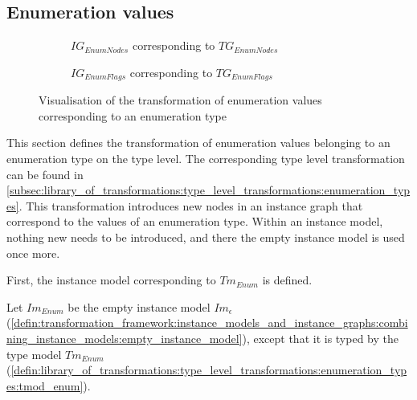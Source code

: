\subsection{Enumeration values}
\label{subsec:library_of_transformations:instance_level_transformations:enumeration_values}

\begin{figure}
    \centering
    \begin{subfigure}{0.45\textwidth}
        \centering
        
        \caption{$IG_{EnumNodes}$ corresponding to $TG_{EnumNodes}$}
        \label{fig:library_of_transformations:instance_level_transformations:enumeration_values:visualisation:groove_nodes}
    \end{subfigure}
    \begin{subfigure}{0.45\textwidth}
        \centering
        
        \caption{$IG_{EnumFlags}$ corresponding to $TG_{EnumFlags}$}
        \label{fig:library_of_transformations:instance_level_transformations:enumeration_values:visualisation:groove_flags}
    \end{subfigure}
    \caption{Visualisation of the transformation of enumeration values corresponding to an enumeration type}
    \label{fig:library_of_transformations:instance_level_transformations:enumeration_values:visualisation}
\end{figure}

This section defines the transformation of enumeration values belonging to an enumeration type on the type level. The corresponding type level transformation can be found in \cref{subsec:library_of_transformations:type_level_transformations:enumeration_types}. This transformation introduces new nodes in an instance graph that correspond to the values of an enumeration type. Within an instance model, nothing new needs to be introduced, and there the empty instance model is used once more.

First, the instance model corresponding to $Tm_{Enum}$ is defined.

\begin{defin}
\label{defin:library_of_transformations:instance_level_transformations:enumeration_values:imod_enum}
Let $Im_{Enum}$ be the empty instance model $Im_\epsilon$ (\cref{defin:transformation_framework:instance_models_and_instance_graphs:combining_instance_models:empty_instance_model}), except that it is typed by the type model $Tm_{Enum}$ (\cref{defin:library_of_transformations:type_level_transformations:enumeration_types:tmod_enum}).
\end{defin}

